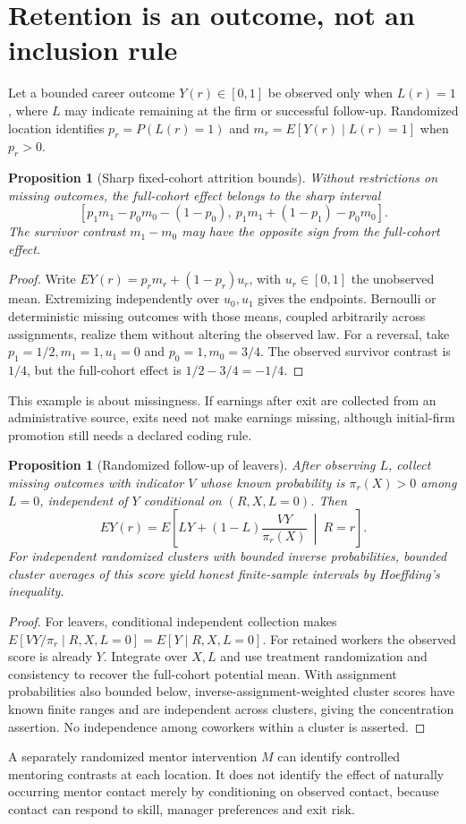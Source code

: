\documentclass[11pt]{article}
\newtheorem{proposition}[theorem]{Proposition}
\theoremstyle{remark}
\begin{document}
\section*{Retention is an outcome, not an inclusion rule}
Let a bounded career outcome $Y(r)\in[0,1]$ be observed only when $L(r)=1$, where $L$ may indicate remaining at the firm or successful follow-up. Randomized location identifies $p_r=P(L(r)=1)$ and $m_r=E[Y(r)\mid L(r)=1]$ when $p_r>0$.

\begin{proposition}[Sharp fixed-cohort attrition bounds]
Without restrictions on missing outcomes, the full-cohort effect belongs to the sharp interval
\[
 [p_1m_1-p_0m_0-(1-p_0),\
   p_1m_1+(1-p_1)-p_0m_0].
\]
The survivor contrast $m_1-m_0$ may have the opposite sign from the full-cohort effect.
\end{proposition}
\begin{proof}
Write $EY(r)=p_rm_r+(1-p_r)u_r$, with $u_r\in[0,1]$ the unobserved mean. Extremizing independently over $u_0,u_1$ gives the endpoints. Bernoulli or deterministic missing outcomes with those means, coupled arbitrarily across assignments, realize them without altering the observed law. For a reversal, take $p_1=1/2,m_1=1,u_1=0$ and $p_0=1,m_0=3/4$. The observed survivor contrast is $1/4$, but the full-cohort effect is $1/2-3/4=-1/4$.
\end{proof}
This example is about missingness. If earnings after exit are collected from an administrative source, exits need not make earnings missing, although initial-firm promotion still needs a declared coding rule.

\begin{proposition}[Randomized follow-up of leavers]
After observing $L$, collect missing outcomes with indicator $V$ whose known probability is $\pi_r(X)>0$ among $L=0$, independent of $Y$ conditional on $(R,X,L=0)$. Then
\[
 EY(r)=E\left[L Y+(1-L)\frac{VY}{\pi_r(X)}\ \middle|\ R=r\right].
\]
For independent randomized clusters with bounded inverse probabilities, bounded cluster averages of this score yield honest finite-sample intervals by Hoeffding's inequality.
\end{proposition}
\begin{proof}
For leavers, conditional independent collection makes $E[VY/\pi_r\mid R,X,L=0]=E[Y\mid R,X,L=0]$. For retained workers the observed score is already $Y$. Integrate over $X,L$ and use treatment randomization and consistency to recover the full-cohort potential mean. With assignment probabilities also bounded below, inverse-assignment-weighted cluster scores have known finite ranges and are independent across clusters, giving the concentration assertion. No independence among coworkers within a cluster is asserted.
\end{proof}
A separately randomized mentor intervention $M$ can identify controlled mentoring contrasts at each location. It does not identify the effect of naturally occurring mentor contact merely by conditioning on observed contact, because contact can respond to skill, manager preferences and exit risk.
\end{document}
